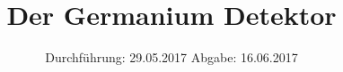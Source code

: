 

\subject{V 18}
\title{Der Germanium Detektor}
\date{
  Durchführung: 29.05.2017
  \hspace{3em}
  Abgabe: 16.06.2017
}



\maketitle
\thispagestyle{empty}
\tableofcontents
\newpage






\printbibliography


